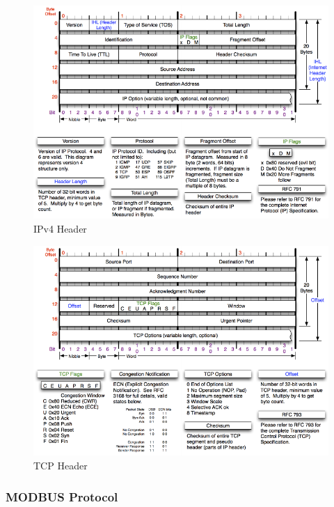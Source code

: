 \documentclass[11pt,a4paper]{article}
\begin{document}
\begin{figure}[h]

{\centering \includegraphics{thesis_files/figure-latex/unnamed-chunk-6-1} 

}

\caption{IPv4 Header}\label{fig:unnamed-chunk-6}
\end{figure}

\begin{figure}[h]

{\centering \includegraphics{thesis_files/figure-latex/unnamed-chunk-7-1} 

}

\caption{TCP Header}\label{fig:unnamed-chunk-7}
\end{figure}

\subsubsection{MODBUS Protocol}\label{modbus-protocol}
\end{document}
